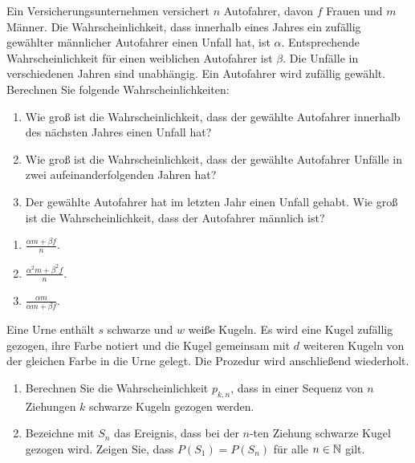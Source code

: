  Ein
Versicherungsunternehmen versichert $n$ Autofahrer, davon $f$ Frauen und $m$
Männer. Die Wahrscheinlichkeit, dass innerhalb eines Jahres ein zufällig
gewählter männlicher Autofahrer einen Unfall hat, ist $\alpha$. Entsprechende
Wahrscheinlichkeit für einen weiblichen Autofahrer ist $\beta$. Die Unfälle in
verschiedenen Jahren sind unabhängig. Ein Autofahrer wird zufällig gewählt. 
Berechnen Sie folgende Wahrscheinlichkeiten:
\begin{enumerate}
    \item Wie groß ist die Wahrscheinlichkeit, dass der gewählte Autofahrer 
        innerhalb des nächsten Jahres einen Unfall hat?

    \item Wie groß ist die Wahrscheinlichkeit, dass der gewählte Autofahrer
        Unfälle in zwei aufeinanderfolgenden Jahren hat?

    \item Der gewählte Autofahrer hat im letzten Jahr einen Unfall gehabt. Wie
        groß ist die Wahrscheinlichkeit, dass der Autofahrer männlich ist?
\end{enumerate}

\solution
\begin{enumerate}
    \item $\frac{\alpha m + \beta f}{n}$.
    \item $\frac{\alpha^2 m + \beta^2 f}{n}$.
    \item $\frac{\alpha m}{\alpha m + \beta f}$.
\end{enumerate}



 Eine Urne
enthält $s$ schwarze und $w$ weiße Kugeln. Es wird eine Kugel zufällig gezogen,
ihre Farbe notiert und die Kugel gemeinsam mit $d$ weiteren Kugeln von der
gleichen Farbe in die Urne gelegt. Die Prozedur wird anschließend wiederholt.
\begin{enumerate}
    \item Berechnen Sie die Wahrscheinlichkeit $p_{k,n}$, dass in einer Sequenz von $n$
        Ziehungen $k$ schwarze Kugeln gezogen werden.
    \item Bezeichne mit $S_n$ das Ereignis, dass bei der $n$-ten Ziehung
        schwarze Kugel gezogen wird. Zeigen Sie, dass $P(S_1)=P(S_n)$ für alle
        $n\in\mathbb N$ gilt.
\end{enumerate}

